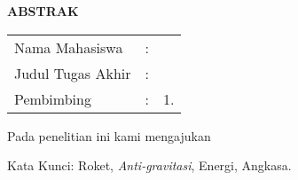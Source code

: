 \begin{center}
  \large\textbf{ABSTRAK}
\end{center}


\vspace{2ex}

\begingroup
\setlength{\tabcolsep}{0pt}

\noindent
\begin{tabularx}{\textwidth}{l >{\centering}m{2em} X}
  Nama Mahasiswa    & : & \name{}         \\

  Judul Tugas Akhir & : & \tatitle{}      \\

  Pembimbing        & : & 1. \advisor{}   \\
  
\end{tabularx}
\endgroup

Pada penelitian ini kami mengajukan \lipsum[1]

Kata Kunci: Roket, \emph{Anti-gravitasi}, Energi, Angkasa.
